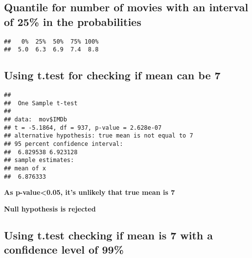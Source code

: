\documentclass[
]{article}
\newenvironment{Shaded}{\begin{snugshade}}{\end{snugshade}}
\newcommand{\AttributeTok}[1]{\textcolor[rgb]{0.77,0.63,0.00}{#1}}
\newcommand{\FloatTok}[1]{\textcolor[rgb]{0.00,0.00,0.81}{#1}}
\newcommand{\FunctionTok}[1]{\textcolor[rgb]{0.00,0.00,0.00}{#1}}
\newcommand{\NormalTok}[1]{#1}
\newcommand{\SpecialCharTok}[1]{\textcolor[rgb]{0.00,0.00,0.00}{#1}}
\begin{document}
\hypertarget{quantile-for-number-of-movies-with-an-interval-of-25-in-the-probabilities}{%
\subsection{Quantile for number of movies with an interval of 25\% in
the
probabilities}\label{quantile-for-number-of-movies-with-an-interval-of-25-in-the-probabilities}}

\begin{Shaded}
\end{Shaded}

\begin{verbatim}
##   0%  25%  50%  75% 100% 
##  5.0  6.3  6.9  7.4  8.8
\end{verbatim}

\hypertarget{using-t.test-for-checking-if-mean-can-be-7}{%
\subsection{Using t.test for checking if mean can be
7}\label{using-t.test-for-checking-if-mean-can-be-7}}

\begin{Shaded}
\end{Shaded}

\begin{verbatim}
## 
##  One Sample t-test
## 
## data:  mov$IMDb
## t = -5.1864, df = 937, p-value = 2.628e-07
## alternative hypothesis: true mean is not equal to 7
## 95 percent confidence interval:
##  6.829538 6.923128
## sample estimates:
## mean of x 
##  6.876333
\end{verbatim}

\textbf{As p-value\textless0.05, it's unlikely that true mean is 7}

\textbf{Null hypothesis is rejected}

\hypertarget{using-t.test-checking-if-mean-is-7-with-a-confidence-level-of-99}{%
\subsection{Using t.test checking if mean is 7 with a confidence level
of
99\%}\label{using-t.test-checking-if-mean-is-7-with-a-confidence-level-of-99}}
\end{document}

